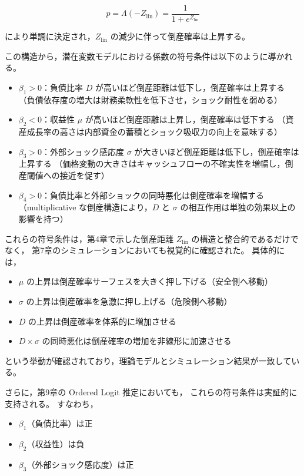 \[
p = \Lambda(-Z_{\text{lin}}) = \frac{1}{1 + e^{Z_{\text{lin}}}}
\]



により単調に決定され，$Z_{\text{lin}}$ の減少に伴って倒産確率は上昇する。

この構造から，潜在変数モデルにおける係数の符号条件は以下のように導かれる。

\begin{itemize}
    \item $\beta_1 > 0$：負債比率 $D$ が高いほど倒産距離は低下し，倒産確率は上昇する  
    （負債依存度の増大は財務柔軟性を低下させ，ショック耐性を弱める）

    \item $\beta_2 < 0$：収益性 $\mu$ が高いほど倒産距離は上昇し，倒産確率は低下する  
    （資産成長率の高さは内部資金の蓄積とショック吸収力の向上を意味する）

    \item $\beta_3 > 0$：外部ショック感応度 $\sigma$ が大きいほど倒産距離は低下し，倒産確率は上昇する  
    （価格変動の大きさはキャッシュフローの不確実性を増幅し，倒産閾値への接近を促す）

    \item $\beta_4 > 0$：負債比率と外部ショックの同時悪化は倒産確率を増幅する  
    （multiplicative な倒産構造により，$D$ と $\sigma$ の相互作用は単独の効果以上の影響を持つ）
\end{itemize}

これらの符号条件は，第4章で示した倒産距離 $Z_{\text{lin}}$ の構造と整合的であるだけでなく，
第7章のシミュレーションにおいても視覚的に確認された。
具体的には，

\begin{itemize}
    \item $\mu$ の上昇は倒産確率サーフェスを大きく押し下げる（安全側へ移動）
    \item $\sigma$ の上昇は倒産確率を急激に押し上げる（危険側へ移動）
    \item $D$ の上昇は倒産確率を体系的に増加させる
    \item $D \times \sigma$ の同時悪化は倒産確率の増加を非線形に加速させる
\end{itemize}

という挙動が確認されており，理論モデルとシミュレーション結果が一致している。

さらに，第9章の Ordered Logit 推定においても，
これらの符号条件は実証的に支持される。
すなわち，

\begin{itemize}
    \item $\beta_1$（負債比率）は正  
    \item $\beta_2$（収益性）は負  
    \item $\beta_3$（外部ショック感応度）は正  
\end{itemize}

